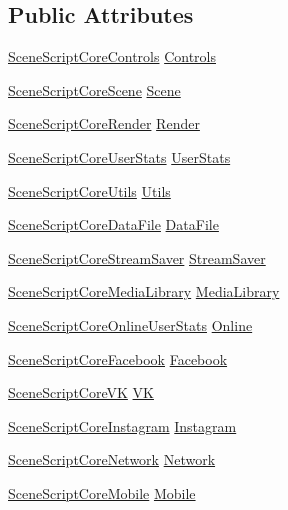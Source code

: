\subsection*{Public Attributes}
\begin{DoxyCompactItemize}
\item 
\hyperlink{class_scene_script_core_controls}{Scene\+Script\+Core\+Controls} \hyperlink{class_scene_script_core_ad533f6453f37d858257fa223b712d47a}{Controls}
\item 
\hyperlink{class_scene_script_core_scene}{Scene\+Script\+Core\+Scene} \hyperlink{class_scene_script_core_a4f4bbd9f194bf418b208ee2976d15691}{Scene}
\item 
\hyperlink{class_scene_script_core_render}{Scene\+Script\+Core\+Render} \hyperlink{class_scene_script_core_a2de11f0c7d18078d0a62f55f2a018a32}{Render}
\item 
\hyperlink{class_scene_script_core_user_stats}{Scene\+Script\+Core\+User\+Stats} \hyperlink{class_scene_script_core_a40169903d7fe2efc189566db200be893}{User\+Stats}
\item 
\hyperlink{class_scene_script_core_utils}{Scene\+Script\+Core\+Utils} \hyperlink{class_scene_script_core_a69272e0a62ddf790bb0dfbdd2fec39ad}{Utils}
\item 
\hyperlink{class_scene_script_core_data_file}{Scene\+Script\+Core\+Data\+File} \hyperlink{class_scene_script_core_a889e54da3108b4697a90082a1ccad83f}{Data\+File}
\item 
\hyperlink{class_scene_script_core_stream_saver}{Scene\+Script\+Core\+Stream\+Saver} \hyperlink{class_scene_script_core_a0ba07cbb5d7b28e5df319b379f63e5e7}{Stream\+Saver}
\item 
\hyperlink{class_scene_script_core_media_library}{Scene\+Script\+Core\+Media\+Library} \hyperlink{class_scene_script_core_af8c348869a46c159cee239ee138a2764}{Media\+Library}
\item 
\hyperlink{class_scene_script_core_online_user_stats}{Scene\+Script\+Core\+Online\+User\+Stats} \hyperlink{class_scene_script_core_afe20b74b2126d47e5e2beb273c5f06ee}{Online}
\item 
\hyperlink{class_scene_script_core_facebook}{Scene\+Script\+Core\+Facebook} \hyperlink{class_scene_script_core_a8fdeb99363c198dbc90aa126a39f9628}{Facebook}
\item 
\hyperlink{class_scene_script_core_v_k}{Scene\+Script\+Core\+VK} \hyperlink{class_scene_script_core_a6e7c70f03122723a455e75d60ba309d0}{VK}
\item 
\hyperlink{class_scene_script_core_instagram}{Scene\+Script\+Core\+Instagram} \hyperlink{class_scene_script_core_a095b0c30c2d27fe428e9af209ec8cb7f}{Instagram}
\item 
\hyperlink{class_scene_script_core_network}{Scene\+Script\+Core\+Network} \hyperlink{class_scene_script_core_a2c1f634ac8a093804f3c6b407938d3ff}{Network}
\item 
\hyperlink{class_scene_script_core_mobile}{Scene\+Script\+Core\+Mobile} \hyperlink{class_scene_script_core_abe267e6c8c7c36e20a605369885d8c4e}{Mobile}
\end{DoxyCompactItemize}


